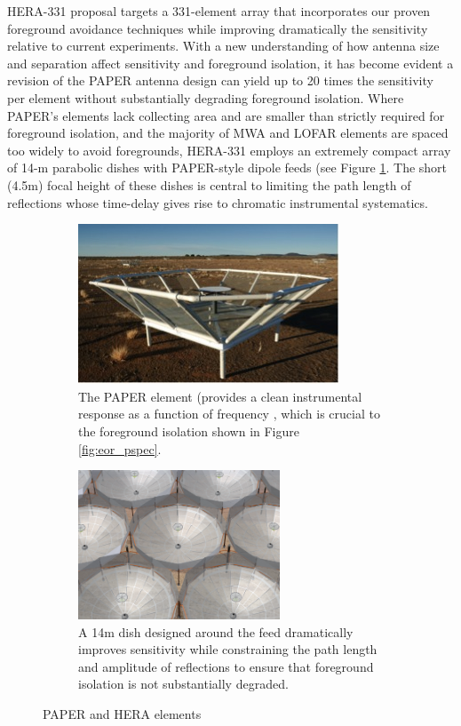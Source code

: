 \documentclass[preprint]{aastex}
\begin{document}
HERA-331 proposal targets a 331-element array that incorporates
our proven foreground avoidance techniques while improving
dramatically the sensitivity relative to current experiments.  With a
new understanding of how antenna size and separation affect
sensitivity and foreground isolation, it has become evident a revision
of the PAPER antenna design can yield up to 20 times the sensitivity
per element without substantially degrading foreground isolation.
Where PAPER's elements lack collecting area and are smaller than
strictly required for foreground isolation, and the majority of MWA
and LOFAR elements are spaced too widely to avoid foregrounds,
HERA-331 employs an extremely compact array of 14-m parabolic dishes
with PAPER-style dipole feeds (see Figure \ref{fig:hera_dish}.  The
short (4.5m) focal height of these dishes is central to limiting the
path length of reflections whose time-delay gives rise to chromatic
instrumental systematics.

\begin{figure}[!ht]
\centering
	\begin{subfigure}[b]{0.46\textwidth}
		\includegraphics[width=\textwidth]{plots/paper_element.jpg}
		\caption{The PAPER element (provides a clean instrumental response as a function
		of frequency \citep{parsons_et_al2010,parsons_et_al2012b}, which is crucial to
		the foreground isolation shown in Figure \ref{fig:eor_pspec}.}
	\end{subfigure}
	\quad
	\begin{subfigure}[b]{0.46\textwidth}
		\includegraphics[height=1.75in]{plots/hera_dish.png}
		\caption{A 14m dish designed around the feed dramatically improves sensitivity while
		constraining the path length and amplitude of reflections to ensure that foreground 
		isolation is not substantially degraded.}
	\end{subfigure}
\caption{PAPER and HERA elements}
\label{fig:hera_dish}
\end{figure}
\end{document}
